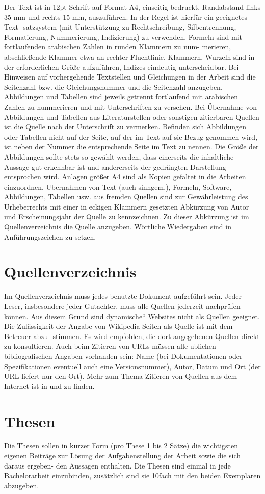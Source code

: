 Der Text ist in 12pt-Schrift auf Format A4, einseitig bedruckt, Randabstand links
35 mm und rechts 15 mm, auszuführen. In der Regel ist hierfür ein geeignetes Text-
satzsystem (mit Unterstützung zu Rechtschreibung, Silbentrennung, Formatierung,
Nummerierung, Indizierung) zu verwenden.
Formeln sind mit fortlaufenden arabischen Zahlen in runden Klammern zu num-
merieren, abschließende Klammer etwa an rechter Fluchtlinie. Klammern, Wurzeln 
sind in der erforderlichen Größe aufzuführen, Indizes eindeutig unterscheidbar.
Bei Hinweisen auf vorhergehende Textstellen und Gleichungen in der Arbeit sind die
Seitenzahl bzw. die Gleichungsnummer und die Seitenzahl anzugeben.
Abbildungen und Tabellen sind jeweils getrennt fortlaufend mit arabischen Zahlen zu
nummerieren und mit Unterschriften zu versehen. Bei Übernahme von Abbildungen
und Tabellen aus Literaturstellen oder sonstigen zitierbaren Quellen ist die Quelle
nach der Unterschrift zu vermerken. Befinden sich Abbildungen oder Tabellen nicht
auf der Seite, auf der im Text auf sie Bezug genommen wird, ist neben der Nummer
die entsprechende Seite im Text zu nennen. Die Größe der Abbildungen sollte stets
so gewählt werden, dass einerseits die inhaltliche Aussage gut erkennbar ist und
andererseits der gedrängten Darstellung entsprochen wird.
Anlagen größer A4 sind als Kopien gefaltet in die Arbeiten einzuordnen.
Ubernahmen von Text (auch sinngem.), Formeln, Software, Abbildungen, Tabellen
usw. aus fremden Quellen sind zur Gewährleistung des Urheberrechts mit einer
in eckigen Klammern gesetzten Abkürzung von Autor und Erscheinungsjahr der
Quelle zu kennzeichnen. Zu dieser Abkürzung ist im Quellenverzeichnis die Quelle
anzugeben. Wörtliche Wiedergaben sind in Anführungszeichen zu setzen.


\section{Quellenverzeichnis}
\label{sec:quellenverz}

Im Quellenverzeichnis muss jedes benutzte Dokument aufgeführt sein. Jeder Leser, 
insbesondere jeder Gutachter, muss alle Quellen jederzeit nachprüfen können.
Aus diesem Grund sind dynamische“ Websites nicht als Quellen geeignet. Die
Zulässigkeit der Angabe von Wikipedia-Seiten als Quelle ist mit dem Betreuer abzu-
stimmen. Es wird empfohlen, die dort angegebenen Quellen direkt zu konsultieren.
Auch beim Zitieren von \acs{URL}s müssen alle ublichen bibliografischen Angaben vorhanden 
sein: Name (bei Dokumentationen oder Spezifikationen eventuell auch eine
Versionsnummer), Autor, Datum und Ort (der \acs{URL} liefert nur den Ort). Mehr zum
Thema Zitieren von Quellen aus dem Internet ist in \cite{RS02} und \cite{Tap96} zu finden.


\section{Thesen}
\label{sec:thesen}

Die Thesen sollen in kurzer Form (pro These 1 bis 2 Sätze) die wichtigsten eigenen
Beiträge zur Lösung der Aufgabenstellung der Arbeit sowie die sich daraus ergeben-
den Aussagen enthalten. Die Thesen sind einmal in jede Bachelorarbeit einzubinden,
zusätzlich sind sie 10fach mit den beiden Exemplaren abzugeben.
